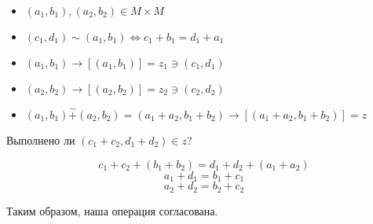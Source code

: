 \begin{example}\itemfix
    \begin{itemize}
        \item \((a_1, b_1), (a_2, b_2) \in M \times M\)
        \item \((c_1, d_1) \sim (a_1, b_1) \Leftrightarrow c_1 + b_1 = d_1 + a_1\)
        \item \((a_1, b_1) \to [(a_1, b_1)] = z_1 \ni (c_1, d_1)\)
        \item \((a_2, b_2) \to [(a_2, b_2)] = z_2 \ni (c_2, d_2)\)
        \item \((a_1, b_1) \stackrel{\sim}{+} (a_2, b_2) = (a_1 + a_2, b_1 + b_2) \to [(a_1 + a_2, b_1 + b_2)] = z\)
    \end{itemize}

    Выполнено ли \((c_1 + c_2, d_1 + d_2) \in z\)?

    \[c_1 + c_2 + (b_1 + b_2) = d_1 + d_2 + (a_1 + a_2)\]
    \[a_1 + d_1 = b_1 + c_1\]
    \[a_2 + d_2 = b_2 + c_2\]

    Таким образом, наша операция согласована.
\end{example}
